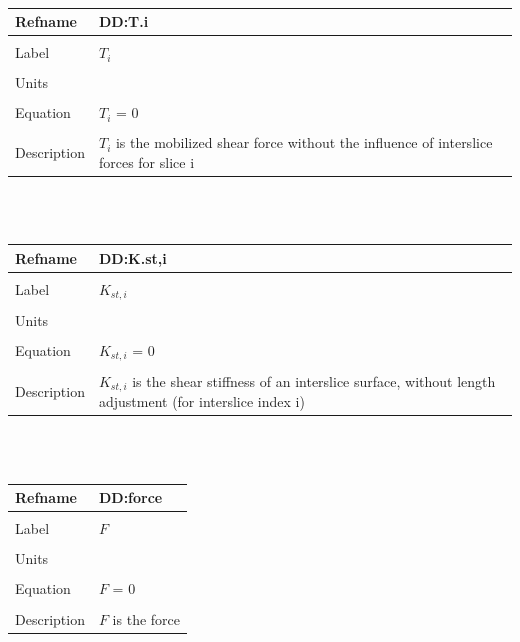 \documentclass[12pt]{article}
\begin{document}
~\newline
\noindent \begin{minipage}{\textwidth}
\begin{tabular}{p{} p{}}
\toprule \textbf{Refname} & \textbf{DD:T.i}
\label{DD:T.i}
\\ \midrule \\
Label & $T_{i}$
\\ \midrule \\
Units & 
\\ \midrule \\
Equation & $T_{i}$ = $0$
\\ \midrule \\
Description & $T_{i}$ is the mobilized shear force without the influence of interslice forces for slice i
\\ \bottomrule \end{tabular}
\end{minipage}\\
~\newline
\noindent \begin{minipage}{\textwidth}
\begin{tabular}{p{} p{}}
\toprule \textbf{Refname} & \textbf{DD:K.st,i}
\label{DD:K.st,i}
\\ \midrule \\
Label & $K_{st,i}$
\\ \midrule \\
Units & 
\\ \midrule \\
Equation & $K_{st,i}$ = $0$
\\ \midrule \\
Description & $K_{st,i}$ is the shear stiffness of an interslice surface, without length adjustment (for interslice index i)
\\ \bottomrule \end{tabular}
\end{minipage}\\
~\newline
\noindent \begin{minipage}{\textwidth}
\begin{tabular}{p{} p{}}
\toprule \textbf{Refname} & \textbf{DD:force}
\label{DD:force}
\\ \midrule \\
Label & $F$
\\ \midrule \\
Units & 
\\ \midrule \\
Equation & $F$ = $0$
\\ \midrule \\
Description & $F$ is the force
\\ \bottomrule \end{tabular}
\end{minipage}\\
\end{document}
